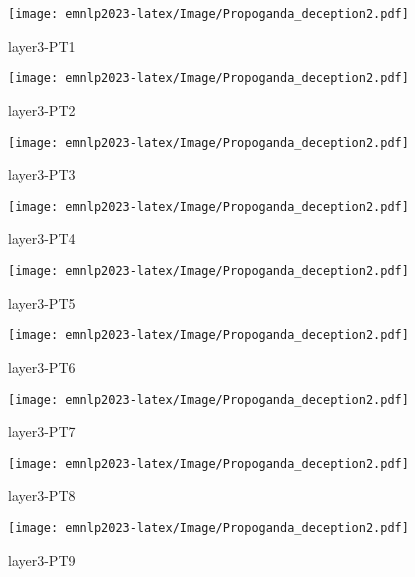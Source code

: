 \begin{figure*}[htbp]
    \begin{subfigure}[b]{0.33\textwidth}
    \centering
        \texttt{[image: emnlp2023-latex/Image/Propoganda\_deception2.pdf]}
        \caption{layer3-PT1}
    \end{subfigure}
    \begin{subfigure}[b]{0.33\textwidth}
    \centering
        \texttt{[image: emnlp2023-latex/Image/Propoganda\_deception2.pdf]}
        \caption{layer3-PT2}
    \end{subfigure}    
    \begin{subfigure}[b]{0.33\textwidth}
    \centering
        \texttt{[image: emnlp2023-latex/Image/Propoganda\_deception2.pdf]}
        \caption{layer3-PT3}
    \end{subfigure}
    \begin{subfigure}[b]{0.33\textwidth}
    \centering
        \texttt{[image: emnlp2023-latex/Image/Propoganda\_deception2.pdf]}
        \caption{layer3-PT4}
    \end{subfigure}
    \begin{subfigure}[b]{0.33\textwidth}
    \centering
        \texttt{[image: emnlp2023-latex/Image/Propoganda\_deception2.pdf]}
        \caption{layer3-PT5}
    \end{subfigure}
    \begin{subfigure}[b]{0.33\textwidth}
    \centering
        \texttt{[image: emnlp2023-latex/Image/Propoganda\_deception2.pdf]}
        \caption{layer3-PT6}
    \end{subfigure}
    \begin{subfigure}[b]{0.33\textwidth}
    \centering
        \texttt{[image: emnlp2023-latex/Image/Propoganda\_deception2.pdf]}
        \caption{layer3-PT7}
    \end{subfigure}
    \begin{subfigure}[b]{0.33\textwidth}
    \centering
        \texttt{[image: emnlp2023-latex/Image/Propoganda\_deception2.pdf]}
        \caption{layer3-PT8}
    \end{subfigure}
    \begin{subfigure}[b]{0.33\textwidth}
    \centering
        \texttt{[image: emnlp2023-latex/Image/Propoganda\_deception2.pdf]}
        \caption{layer3-PT9}
    \end{subfigure}
\end{figure*}


